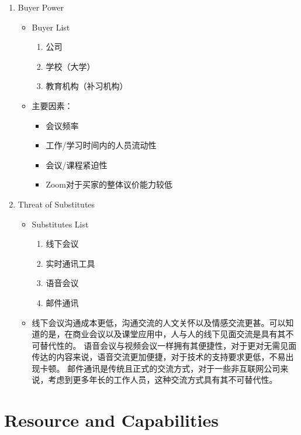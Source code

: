 \documentclass{beamer}
\begin{document}
\begin{frame}[allowframebreaks]
\begin{enumerate}
        
    \framebreak
    \item Buyer Power
    \begin{itemize}
        \item Buyer List \begin{enumerate}
            \item 公司
            \item 学校（大学）
            \item 教育机构（补习机构）
        \end{enumerate}
        \item 主要因素：
        \begin{itemize}
            \item 会议频率
            \item 工作/学习时间内的人员流动性
            \item 会议/课程紧迫性
            \item Zoom对于买家的整体议价能力较低
        \end{itemize}
        
        
    \end{itemize}
    \framebreak
    \item Threat of Substitutes
    \begin{itemize}
        \item Substitutes List \begin{enumerate}
        \item 线下会议
        \item 实时通讯工具
        \item 语音会议
        \item 邮件通讯
        \end{enumerate}
        \item 线下会议沟通成本更低，沟通交流的人文关怀以及情感交流更甚。可以知道的是，在商业会议以及课堂应用中，人与人的线下见面交流是具有其不可替代性的。
        语音会议与视频会议一样拥有其便捷性，对于更对无需见面传达的内容来说，语音交流更加便捷，对于技术的支持要求更低，不易出现卡顿。
        邮件通讯是传统且正式的交流方式，对于一些非互联网公司来说，考虑到更多年长的工作人员，这种交流方式具有其不可替代性。        
    \end{itemize}
    \end{enumerate}
\end{frame}

\section{Resource and Capabilities}
\end{document}
